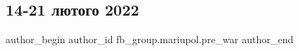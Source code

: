  
 
 
 
 

\subsection{14-21 лютого 2022}
\label{sec:13_02_2023.fb.fb_group.mariupol.pre_war.2.14_21_lyutogo_2022}

\ifcmt
 author_begin
   author_id fb_group.mariupol.pre_war
 author_end
\fi
